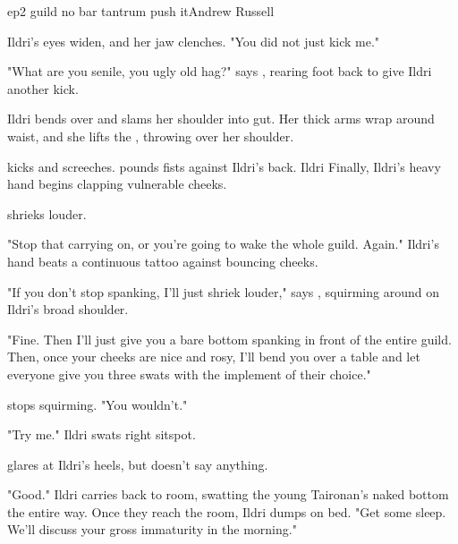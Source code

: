 \documentclass{book}
\begin{document}
\begin{childnode}{ep2 guild no bar tantrum push it}{Andrew Russell}


    Ildri's eyes widen, and her jaw clenches. "You did not just kick me."

    "What are you senile, you ugly old hag?" says \name{}, rearing \hisher{} foot back to give Ildri another kick.

    Ildri bends over and slams her shoulder into \names{} gut. Her thick arms wrap around \names{} waist, and she lifts the , throwing \name{} over her shoulder.

        \name{} kicks and screeches. \HeShe{} pounds \hisher{} fists against Ildri's back. Ildri  
         Finally, Ildri's heavy hand begins clapping \names{} 
        vulnerable cheeks. 

    \name{} shrieks louder.

    "Stop that carrying on, or you're going to wake the whole guild. Again." Ildri's hand beats a continuous tattoo against \names{} bouncing cheeks. 

    "If you don't stop spanking, I'll just shriek louder," says \name{}, squirming around on Ildri's broad shoulder.

    "Fine. Then I'll just give you a bare bottom spanking in front of the entire guild. Then, once your cheeks are nice and rosy, I'll bend you over a table and let 
    everyone give you three swats with the implement of their choice."

    \name{} stops squirming. "You wouldn't."

    "Try me." Ildri swats \names{} right sitspot.

    \name{} glares at Ildri's heels, but doesn't say anything.

    "Good." Ildri carries \name{} back to \names{} room, swatting the young Taironan's naked bottom the entire way. Once they reach the room, Ildri dumps \name{} on 
    \names{} bed. "Get some sleep. We'll discuss your gross immaturity in the morning."


\end{childnode}
\end{document}
